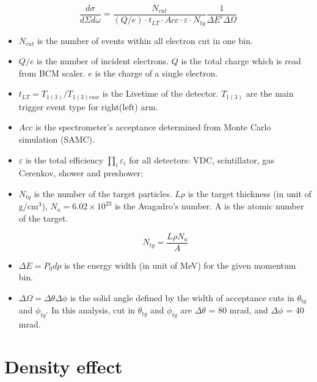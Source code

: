 \begin{equation}
\frac{d\sigma}{d\Sigma d\omega} = \frac{N_{cut}}{(Q/e) \cdot t_{LT} \cdot Acc \cdot \varepsilon \cdot N_{tg}}
\frac{1}{\Delta E' \Delta \Omega}
\end{equation}

\begin{itemize}
\item $N_{cut}$ is the number of events within all electron cut in one bin.

\item $Q/e$ is the number of incident electrons. $Q$ is the total charge which is read from BCM scaler.
$e$ is the charge of a single electron.

\item $t_{LT} = T_{1(3)}/T_{1(3)raw}$ is the Livetime of the detector.
$T_{1(3)}$ are the main trigger event type for right(left) arm.

\item $Acc$ is the spectrometer's acceptance determined from Monte Carlo simulation (SAMC).

\item $\varepsilon$ is the total efficiency $\prod_i \varepsilon_i$ for all detectors:
VDC, scintillator, gas Cerenkov, shower and preshower;

\item $N_{tg}$ is the number of the target particles.  $L\rho$ is the target thickness (in unit of g/cm$^3$),
$N_a = 6.02 \times 10^{23}$ is the Avagadro's number. A is the atomic number of the target.

\begin{equation}
N_{tg} = \frac{L\rho N_a}{A}
\end{equation}

\item $\Delta E = P_0 dp$ is the energy width (in unit of MeV) for the given momentum bin.

\item $\Delta \Omega = \Delta \theta \Delta \phi$ is the solid angle defined by the width of acceptance cuts in
$\theta_{tg}$ and $\phi_{tg}$. In this analysis, cut in $\theta_{tg}$ and $\phi_{tg}$ are $\Delta \theta$ = 80 mrad,
and $\Delta \phi$ = 40 mrad.

\end{itemize}

\section{Density effect}

